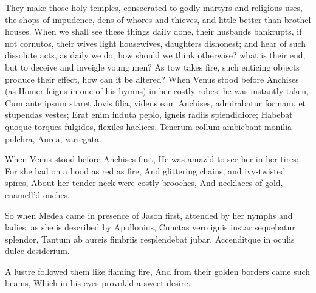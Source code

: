 They make those holy temples, consecrated to godly martyrs and
religious uses, the shops of impudence, dens of whores and thieves, and
little better than brothel houses. When we shall see these things daily
done, their husbands bankrupts, if not cornutos, their wives light
housewives, daughters dishonest; and hear of such dissolute acts, as
daily we do, how should we think otherwise? what is their end, but to
deceive and inveigle young men? As tow takes fire, such enticing
objects produce their effect, how can it be altered? When Venus stood
before Anchises (as Homer feigns in one of his hymns) in her
costly robes, he was instantly taken,
Cum ante ipsum staret Jovis filia, videns eam
Anchises, admirabatur formam, et stupendas vestes;
Erat enim induta peplo, igneis radiis spiendidiore;
Habebat quoque torques fulgidos, flexiles haelices,
Tenerum collum ambiebant monilia pulchra,
Aurea, variegata.---

When Venus stood before Anchises first,
He was amaz'd to see her in her tires;
For she had on a hood as red as fire,
And glittering chains, and ivy-twisted spires,
About her tender neck were costly brooches,
And necklaces of gold, enamell'd ouches.

So when Medea came in presence of Jason first, attended by her nymphs
and ladies, as she is described by Apollonius,
Cunctas vero ignis instar sequebatur splendor,
Tantum ab aureis fimbriis resplendebat jubar,
Accenditque in oculis dulce desiderium.

A lustre followed them like flaming fire,
And from their golden borders came such beams,
Which in his eyes provok'd a sweet desire.


